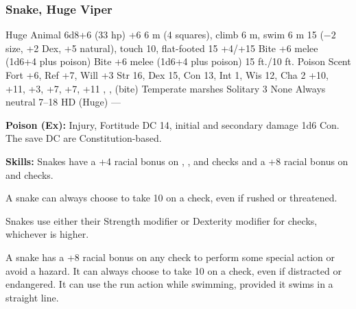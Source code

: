 \subsubsection{Snake, Huge Viper}
\begin{MonsterStats}
{Huge Animal}
{6d8+6 (33 hp)}
{+6}
{6 m (4 squares), climb 6 m, swim 6 m}
{15 ($-2$ size, +2 Dex, +5 natural), touch 10, flat-footed 15}
{+4/+15}
{Bite +6 melee (1d6+4 plus poison)}
{Bite +6 melee (1d6+4 plus poison)}
{15 ft./10 ft.}
{Poison}
{Scent}
{Fort +6, Ref +7, Will +3}
{Str 16, Dex 15, Con 13, Int 1, Wis 12, Cha 2}
{ +10,  +11,  +3,  +7,  +7,  +11}
{, ,  (bite)}
{Temperate marshes}
{Solitary}
{3}
{None}
{Always neutral}
{7--18 HD (Huge)}
{---}
\end{MonsterStats}

\textbf{Poison (Ex):} Injury, Fortitude DC 14, initial and secondary damage 1d6 Con. The save DC are Constitution-based.

\textbf{Skills:} Snakes have a +4 racial bonus on , , and  checks and a +8 racial bonus on  and  checks.

A snake can always choose to take 10 on a  check, even if rushed or threatened.

Snakes use either their Strength modifier or Dexterity modifier for  checks, whichever is higher.

A snake has a +8 racial bonus on any  check to perform some special action or avoid a hazard. It can always choose to take 10 on a  check, even if distracted or endangered. It can use the run action while swimming, provided it swims in a straight line.
